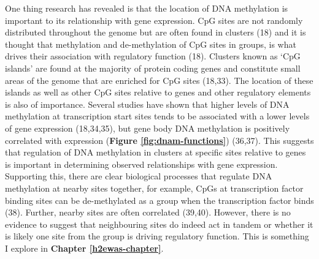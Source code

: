 \documentclass[11pt,oneside]{bristolthesis}
\begin{document}
One thing research has revealed is that the location of DNA methylation is important to its relationship with gene expression. CpG sites are not randomly distributed throughout the genome but are often found in clusters (18) and it is thought that methylation and de-methylation of CpG sites in groups, is what drives their association with regulatory function (18). Clusters known as `CpG islands' are found at the majority of protein coding genes and constitute small areas of the genome that are enriched for CpG sites (18,33). The location of these islands as well as other CpG sites relative to genes and other regulatory elements is also of importance. Several studies have shown that higher levels of DNA methylation at transcription start sites tends to be associated with a lower levels of gene expression (18,34,35), but gene body DNA methylation is positively correlated with expression (\textbf{Figure \ref{fig:dnam-functions}}) (36,37). This suggests that regulation of DNA methylation in clusters at specific sites relative to genes is important in determining observed relationships with gene expression. Supporting this, there are clear biological processes that regulate DNA methylation at nearby sites together, for example, CpGs at transcription factor binding sites can be de-methylated as a group when the transcription factor binds (38). Further, nearby sites are often correlated (39,40). However, there is no evidence to suggest that neighbouring sites do indeed act in tandem or whether it is likely one site from the group is driving regulatory function. This is something I explore in \textbf{Chapter \ref{h2ewas-chapter}}.
\end{document}

